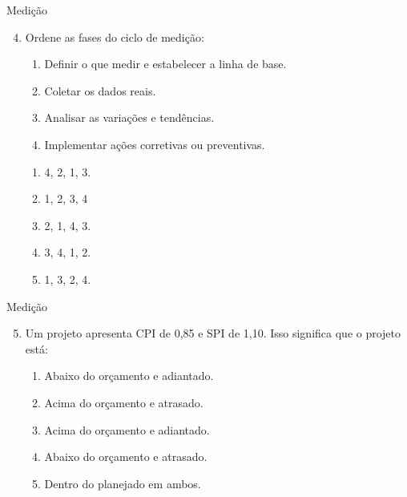 \documentclass{beamer}
\begin{document}
\begin{frame}{Medição}
	\begin{enumerate}
		\setcounter{enumi}{3}
		\justifying
		\item Ordene as fases do ciclo de medição:
		\begin{enumerate}[I]
			\item Definir o que medir e estabelecer a linha de base.
			\item Coletar os dados reais.
			\item Analisar as variações e tendências.
			\item Implementar ações corretivas ou preventivas.
		\end{enumerate}
		\begin{enumerate}[a]
			\item 4, 2, 1, 3.
			\item \alert<2>{1, 2, 3, 4}
			\item 2, 1, 4, 3.
			\item 3, 4, 1, 2.
			\item 1, 3, 2, 4.
		\end{enumerate}
	\end{enumerate}
\end{frame}

\begin{frame}{Medição}
	\begin{enumerate}
		\setcounter{enumi}{4}
		\justifying
		\item Um projeto apresenta CPI de 0,85 e SPI de 1,10. Isso significa que o projeto está:
		\begin{enumerate}[a]
			\item Abaixo do orçamento e adiantado.
			\item Acima do orçamento e atrasado.
			\item \alert<2>{Acima do orçamento e adiantado.}
			\item Abaixo do orçamento e atrasado.
			\item Dentro do planejado em ambos.
		\end{enumerate}
	\end{enumerate}
\end{frame}
\end{document}
